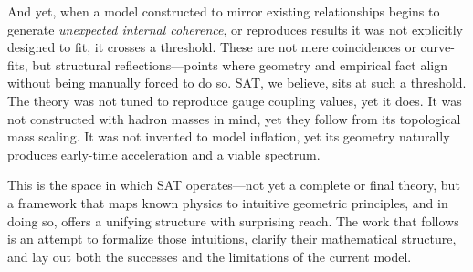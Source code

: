 \documentclass[12pt]{article}
\begin{document}
And yet, when a model constructed to mirror existing relationships begins to generate \emph{unexpected internal coherence}, or reproduces results it was not explicitly designed to fit, it crosses a threshold. These are not mere coincidences or curve-fits, but structural reflections---points where geometry and empirical fact align without being manually forced to do so. SAT, we believe, sits at such a threshold. The theory was not tuned to reproduce gauge coupling values, yet it does. It was not constructed with hadron masses in mind, yet they follow from its topological mass scaling. It was not invented to model inflation, yet its geometry naturally produces early-time acceleration and a viable spectrum.

This is the space in which SAT operates---not yet a complete or final theory, but a framework that maps known physics to intuitive geometric principles, and in doing so, offers a unifying structure with surprising reach. The work that follows is an attempt to formalize those intuitions, clarify their mathematical structure, and lay out both the successes and the limitations of the current model.
\end{document}
